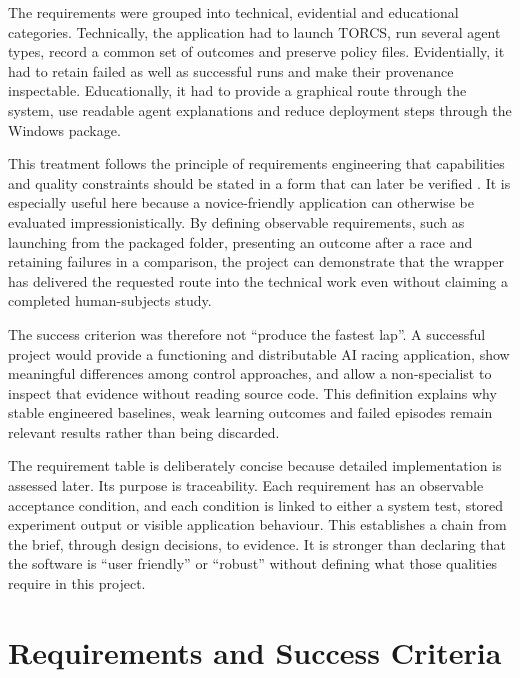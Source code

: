 The requirements were grouped into technical, evidential and educational categories. Technically, the application had to launch TORCS, run several agent types, record a common set of outcomes and preserve policy files. Evidentially, it had to retain failed as well as successful runs and make their provenance inspectable. Educationally, it had to provide a graphical route through the system, use readable agent explanations and reduce deployment steps through the Windows package.

This treatment follows the principle of requirements engineering that capabilities and quality constraints should be stated in a form that can later be verified \parencite{iso29148}. It is especially useful here because a novice-friendly application can otherwise be evaluated impressionistically. By defining observable requirements, such as launching from the packaged folder, presenting an outcome after a race and retaining failures in a comparison, the project can demonstrate that the wrapper has delivered the requested route into the technical work even without claiming a completed human-subjects study.

The success criterion was therefore not \enquote{produce the fastest lap}. A successful project would provide a functioning and distributable AI racing application, show meaningful differences among control approaches, and allow a non-specialist to inspect that evidence without reading source code. This definition explains why stable engineered baselines, weak learning outcomes and failed episodes remain relevant results rather than being discarded.

The requirement table is deliberately concise because detailed implementation is assessed later. Its purpose is traceability. Each requirement has an observable acceptance condition, and each condition is linked to either a system test, stored experiment output or visible application behaviour. This establishes a chain from the brief, through design decisions, to evidence. It is stronger than declaring that the software is \enquote{user friendly} or \enquote{robust} without defining what those qualities require in this project.


\section{Requirements and Success Criteria}
\label{ch:requirements}

